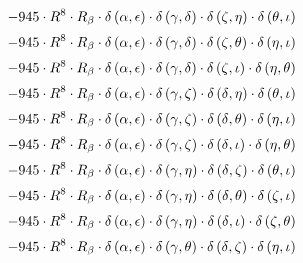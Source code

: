 \begin{subequations}
\begin{gather}
 \\[0.2em] \notag 		 - 945 \cdot R^{8} \cdot R_{\beta{}} \cdot \delta{}\left(\alpha{}, \epsilon{}\right) \cdot \delta{}\left(\gamma{}, \delta{}\right) \cdot \delta{}\left(\zeta{}, \eta{}\right) \cdot \delta{}\left(\theta{}, \iota{}\right) 
 \\[0.2em] \notag 		 - 945 \cdot R^{8} \cdot R_{\beta{}} \cdot \delta{}\left(\alpha{}, \epsilon{}\right) \cdot \delta{}\left(\gamma{}, \delta{}\right) \cdot \delta{}\left(\zeta{}, \theta{}\right) \cdot \delta{}\left(\eta{}, \iota{}\right) 
 \\[0.2em] \notag 		 - 945 \cdot R^{8} \cdot R_{\beta{}} \cdot \delta{}\left(\alpha{}, \epsilon{}\right) \cdot \delta{}\left(\gamma{}, \delta{}\right) \cdot \delta{}\left(\zeta{}, \iota{}\right) \cdot \delta{}\left(\eta{}, \theta{}\right) 
 \\[0.2em] \notag 		 - 945 \cdot R^{8} \cdot R_{\beta{}} \cdot \delta{}\left(\alpha{}, \epsilon{}\right) \cdot \delta{}\left(\gamma{}, \zeta{}\right) \cdot \delta{}\left(\delta{}, \eta{}\right) \cdot \delta{}\left(\theta{}, \iota{}\right) 
 \\[0.2em] \notag 		 - 945 \cdot R^{8} \cdot R_{\beta{}} \cdot \delta{}\left(\alpha{}, \epsilon{}\right) \cdot \delta{}\left(\gamma{}, \zeta{}\right) \cdot \delta{}\left(\delta{}, \theta{}\right) \cdot \delta{}\left(\eta{}, \iota{}\right) 
 \\[0.2em] \notag 		 - 945 \cdot R^{8} \cdot R_{\beta{}} \cdot \delta{}\left(\alpha{}, \epsilon{}\right) \cdot \delta{}\left(\gamma{}, \zeta{}\right) \cdot \delta{}\left(\delta{}, \iota{}\right) \cdot \delta{}\left(\eta{}, \theta{}\right) 
 \\[0.2em] \notag 		 - 945 \cdot R^{8} \cdot R_{\beta{}} \cdot \delta{}\left(\alpha{}, \epsilon{}\right) \cdot \delta{}\left(\gamma{}, \eta{}\right) \cdot \delta{}\left(\delta{}, \zeta{}\right) \cdot \delta{}\left(\theta{}, \iota{}\right) 
 \\[0.2em] \notag 		 - 945 \cdot R^{8} \cdot R_{\beta{}} \cdot \delta{}\left(\alpha{}, \epsilon{}\right) \cdot \delta{}\left(\gamma{}, \eta{}\right) \cdot \delta{}\left(\delta{}, \theta{}\right) \cdot \delta{}\left(\zeta{}, \iota{}\right) 
 \\[0.2em] \notag 		 - 945 \cdot R^{8} \cdot R_{\beta{}} \cdot \delta{}\left(\alpha{}, \epsilon{}\right) \cdot \delta{}\left(\gamma{}, \eta{}\right) \cdot \delta{}\left(\delta{}, \iota{}\right) \cdot \delta{}\left(\zeta{}, \theta{}\right) 
 \\[0.2em] \notag 		 - 945 \cdot R^{8} \cdot R_{\beta{}} \cdot \delta{}\left(\alpha{}, \epsilon{}\right) \cdot \delta{}\left(\gamma{}, \theta{}\right) \cdot \delta{}\left(\delta{}, \zeta{}\right) \cdot \delta{}\left(\eta{}, \iota{}\right) 

\end{gather}
\end{subequations}
